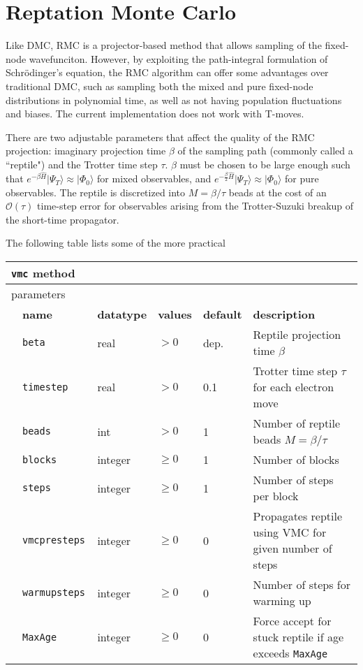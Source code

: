 \section{Reptation Monte Carlo}
\label{sec:rmc}
Like DMC, RMC is a projector-based method that allows sampling of the fixed-node wavefunciton.  However, by exploiting the path-integral formulation of Schr\"{o}dinger's equation, the RMC algorithm can offer some advantages over traditional DMC, such as sampling both the mixed and pure fixed-node distributions in polynomial time, as well as not having population fluctuations and biases.  The current implementation does not work with T-moves.

There are two adjustable parameters that affect the quality of the RMC projection:  imaginary projection time $\beta$ of the sampling path (commonly called a ``reptile") and the Trotter time step $\tau$.  $\beta$ must be chosen to be large enough such that $e^{-\beta \hat{H}}|\Psi_T\rangle \approx |\Phi_0\rangle$ for mixed observables, and $e^{-\frac{\beta}{2} \hat{H}}|\Psi_T\rangle \approx |\Phi_0\rangle$ for pure observables.  The reptile is discretized into $M=\beta/\tau$ beads at the cost of an $\mathcal{O}(\tau)$ time-step error for observables arising from the Trotter-Suzuki breakup of the short-time propagator.  

The following table lists some of the more practical 
\begin{table}[h]
\begin{center}
\begin{tabularx}{\textwidth}{l l l l l X }
\hline
\multicolumn{6}{l}{\texttt{vmc} method} \\
\hline
\multicolumn{2}{l}{parameters}  & \multicolumn{4}{l}{}\\
   &   \bfseries name     & \bfseries datatype & \bfseries values & \bfseries default   & \bfseries description \\
   &   \texttt{beta            } &  real  & $> 0$ & dep.   & Reptile projection time $\beta$  \\
   &   \texttt{timestep            } &  real     & $> 0$ & 0.1 & Trotter time step $\tau$ for each electron move \\
   &   \texttt{beads           } &  int     & $> 0$ & 1 & Number of reptile beads $M=\beta/\tau$ \\
   &   \texttt{blocks              } &  integer  & $\ge 0$ & 1   & Number of blocks            \\
   &   \texttt{steps               } &  integer  & $\ge 0$ & 1   & Number of steps per block   \\
   &   \texttt{vmcpresteps        } &  integer  & $\ge 0$ & 0   & Propagates reptile using VMC for given number of steps\\
   &   \texttt{warmupsteps         } &  integer  & $\ge 0$ & 0   & Number of steps for warming up\\
   &   \texttt{MaxAge              }   & integer & $\ge 0 $   & 0   & Force accept for stuck reptile if age exceeds \texttt{MaxAge} \\
  \hline
\end{tabularx}
\end{center}
\end{table}

